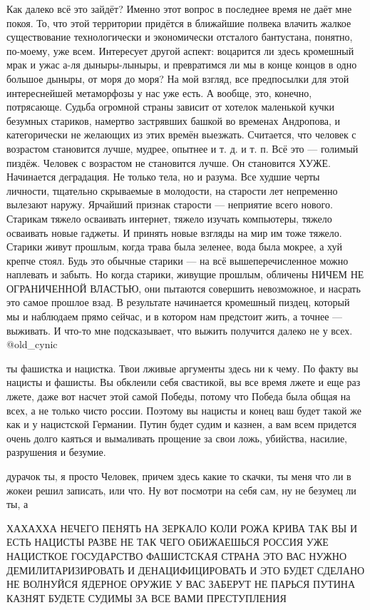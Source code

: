 Как далеко всё это зайдёт?
Именно этот вопрос в последнее время не даёт мне покоя.
То, что этой территории придётся в ближайшие полвека влачить жалкое существование технологически и экономически отсталого бантустана, понятно, по-моему, уже всем.
Интересует другой аспект: воцарится ли здесь кромешный мрак и ужас а-ля дыныры-лыныры, и превратимся ли мы в конце концов в одно большое дыныры, от моря до моря?
На мой взгляд, все предпосылки для этой интереснейшей метаморфозы у нас уже есть.
А вообще, это, конечно, потрясающе.
Судьба огромной страны зависит от хотелок маленькой кучки безумных стариков, намертво застрявших башкой во временах Андропова, и категорически не желающих из этих времён выезжать.
Считается, что человек с возрастом становится лучше, мудрее, опытнее и т. д. и т. п.
Всё это — голимый пиздёж.
Человек с возрастом не становится лучше.
Он становится ХУЖЕ.
Начинается деградация.
Не только тела, но и разума.
Все худшие черты личности, тщательно скрываемые в молодости, на старости лет непременно вылезают наружу.
Ярчайший признак старости — неприятие всего нового.
Старикам тяжело осваивать интернет, тяжело изучать компьютеры, тяжело осваивать новые гаджеты.
И принять новые взгляды на мир им тоже тяжело.
Старики живут прошлым, когда трава была зеленее, вода была мокрее, а хуй крепче стоял.
Будь это обычные старики — на всё вышеперечисленное можно наплевать и забыть.
Но когда старики, живущие прошлым, обличены НИЧЕМ НЕ ОГРАНИЧЕННОЙ ВЛАСТЬЮ, они пытаются совершить невозможное, и насрать это самое прошлое взад.
В результате начинается кромешный пиздец, который мы и наблюдаем прямо сейчас, и в котором нам предстоит жить, а точнее — выживать.
И что-то мне подсказывает, что выжить получится далеко не у всех.
@old_cynic





ты фашистка и нацистка. Твои лживые аргументы здесь ни к чему. По факту вы
нацисты и фашисты. Вы обклеили себя свастикой, вы все время лжете и еще раз
лжете, даже вот насчет этой самой Победы, потому что Победа была общая на всех,
а не только чисто россии. Поэтому вы нацисты и конец ваш будет такой же как и у
нацистской Германии. Путин будет судим и казнен, а вам всем придется очень
долго каяться и вымаливать прощение за свои ложь, убийства, насилие, разрушения
и безумие.

дурачок ты, я просто Человек, причем здесь какие то скачки, ты меня что ли в
жокеи решил записать, или что. Ну вот посмотри на себя сам, ну не безумец ли
ты, а

ХАХАХХА НЕЧЕГО ПЕНЯТЬ НА ЗЕРКАЛО КОЛИ РОЖА КРИВА ТАК ВЫ И ЕСТЬ НАЦИСТЫ РАЗВЕ НЕ
ТАК ЧЕГО ОБИЖАЕШЬСЯ РОССИЯ УЖЕ НАЦИСТКОЕ ГОСУДАРСТВО ФАШИСТСКАЯ СТРАНА ЭТО ВАС
НУЖНО ДЕМИЛИТАРИЗИРОВАТЬ И ДЕНАЦИФИЦИРОВАТЬ И ЭТО БУДЕТ СДЕЛАНО НЕ ВОЛНУЙСЯ
ЯДЕРНОЕ ОРУЖИЕ У ВАС ЗАБЕРУТ НЕ ПАРЬСЯ ПУТИНА КАЗНЯТ БУДЕТЕ СУДИМЫ ЗА ВСЕ ВАМИ
ПРЕСТУПЛЕНИЯ


